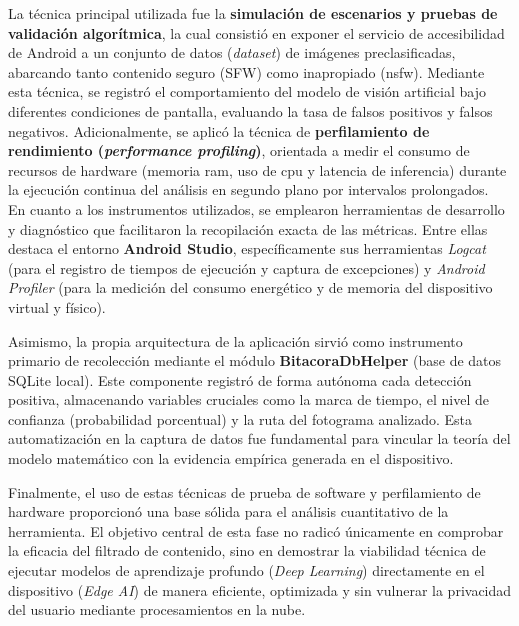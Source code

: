 La técnica principal utilizada fue la \textbf{simulación de escenarios y pruebas de validación algorítmica}, la cual consistió en exponer el servicio de accesibilidad de Android 
a un conjunto de datos (\textit{dataset}) de imágenes preclasificadas, abarcando tanto contenido seguro (SFW) como inapropiado (\gls{nsfw}). Mediante esta técnica, se registró el comportamiento 
del modelo de visión artificial bajo diferentes condiciones de pantalla, evaluando la tasa de falsos positivos y falsos negativos. Adicionalmente, se aplicó la técnica de \textbf{perfilamiento de rendimiento (\textit{performance profiling})}, 
orientada a medir el consumo de recursos de hardware (memoria \gls{ram}, uso de \gls{cpu} y latencia de inferencia) durante la ejecución continua del análisis en segundo plano por intervalos prolongados.\\



En cuanto a los instrumentos utilizados, se emplearon herramientas de desarrollo y diagnóstico que facilitaron la recopilación exacta de las métricas. Entre ellas destaca el entorno \textbf{Android Studio}, específicamente sus herramientas \textit{Logcat} (para el registro de tiempos de ejecución y captura de excepciones) y \textit{Android Profiler} (para la medición del consumo energético y de memoria del dispositivo virtual y físico).

Asimismo, la propia arquitectura de la aplicación sirvió como instrumento primario de recolección mediante el módulo \textbf{BitacoraDbHelper} (base de datos SQLite local). Este componente registró de forma autónoma cada detección positiva, almacenando variables cruciales como la marca de tiempo, el nivel de confianza (probabilidad porcentual) y la ruta del fotograma analizado. Esta automatización en la captura de datos fue fundamental para vincular la teoría del modelo matemático con la evidencia empírica generada en el dispositivo.

Finalmente, el uso de estas técnicas de prueba de software y perfilamiento de hardware proporcionó una base sólida para el análisis cuantitativo de la herramienta. El objetivo central de esta fase no radicó únicamente en comprobar la eficacia del filtrado de contenido, sino en demostrar la viabilidad técnica de ejecutar modelos de aprendizaje profundo (\textit{Deep Learning}) directamente en el dispositivo (\textit{Edge AI}) de manera eficiente, optimizada y sin vulnerar la privacidad del usuario mediante procesamientos en la nube.

